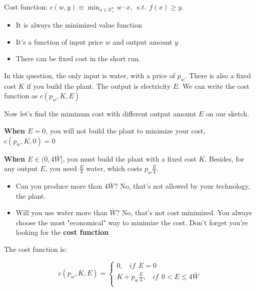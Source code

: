 \documentclass{article}
\newcommand{\R}{\mathbb{R}}
\begin{document}
\begin{mdframed}[backgroundcolor=blue!20,linecolor=white]
Cost function: $c(w,y) \equiv \min_{x \in \R^n_+} w \cdot x , \ \ s.t. \ \ f(x) \ge y.$

\begin{itemize}
\item It is always the minimized value function
\item It's a function of input price $w$ and output amount $y$
\item There can be fixed cost in the short run.
\end{itemize}

In this question, the only input is water, with a price of $p_w$. There is also a fixed cost $K$ if you
build the plant. The output is electricity $E$. We can write the cost function as $c(p_w,K,E)$

\vspace{3mm}

Now let's find the miminum cost with different output amount $E$ on our sketch.

\vspace{3mm}

\textbf{When $E=0$}, you will not build the plant to minimize your cost, $c(p_w,K,0) = 0$

\vspace{3mm}

\textbf{When $E \in (0,4\bar{W}]$}, you must build the plant with a fixed cost $K$. Besides, for any output $E$, you need  $\frac{E}{4}$ water,
which costs $p_w\frac{E}{4}$.

\begin{itemize}
\item Can you produce more than $4\bar{W}$? No, that's not allowed by your technology, the plant.
\item Will you use water more than $\bar{W}$? No, that's not cost minimized. You always choose the most
"economical" way to minimize the cost. Don't forget you're looking for the \textbf{cost function}
\end{itemize}

\end{mdframed}


The cost function is:


\begin{equation}
c(p_w,K,E)=
    \begin{cases}
0, \ \ \ \ if \ \ E = 0 \\
K + p_w\frac{E}{4}, \ \ \ \ if \ \   0 <  E \le 4\bar{W} \\
    \end{cases}
    \label{eq:hydro_c}   
\end{equation}
\end{document}
